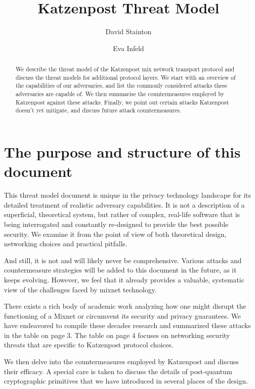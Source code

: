 \documentclass{article}
\title{Katzenpost Threat Model}
\author{David Stainton \and Eva Infeld}
\begin{document}
\maketitle
\begin{abstract}
\noindent We describe the threat model of the Katzenpost mix network transport protocol and discuss the threat models for additional protocol layers. We start with an overview of the capabilities of our adversaries, and list the commonly considered attacks these adversaries are capable of. We then summarise the countermeasures employed by Katzenpost against these attacks. Finally, we point out certain attacks Katzenpost doesn't yet mitigate, and discuss future attack countermeasures.
\end{abstract}

\small
\tableofcontents
\normalsize

\section{The purpose and structure of this document}

This threat model document is unique in the privacy technology landscape for its detailed treatment of realistic adversary capabilities. It is not a description of a superficial, theoretical system, but rather of complex, real-life software that is being interrogated and constantly re-designed to provide the best possible security. We examine it from the point of view of both theoretical design, networking choices and practical pitfalls. 

And still, it is not and will likely never be comprehensive. Various attacks and countermeasure strategies will be added to this document in the future, as it keeps evolving. However, we feel that it already provides a valuable, systematic view of the challenges faced by mixnet technology.

There exists a rich body of academic work analyzing how one might disrupt the functioning of a Mixnet or circumvent its security and privacy guarantees. We have endeavored to compile these decades research and summarized these attacks in the table on page 3. The table on page 4 focuses on networking security threats that are specific to Katzenpost protocol choices.

We then delve into the countermeasures employed by Katzenpost and discuss their efficacy. A special care is taken to discuss the details of post-quantum cryptographic primitives that we have introduced in several places of the design.
\end{document}
